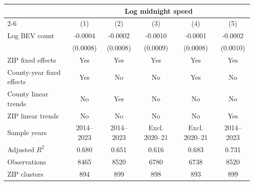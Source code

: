 {
\def\sym#1{\ifmmode^{#1}\else\(^{#1}\)\fi}
\begin{tabular}{l*{5}{c}}
\hline\hline
                    &\multicolumn{5}{c}{Log midnight speed}                                                                       \\\cmidrule(lr){2-6}
                    &\multicolumn{1}{c}{(1)}         &\multicolumn{1}{c}{(2)}         &\multicolumn{1}{c}{(3)}         &\multicolumn{1}{c}{(4)}         &\multicolumn{1}{c}{(5)}         \\
\hline
Log BEV count       &     -0.0004         &     -0.0002         &     -0.0010         &     -0.0001         &     -0.0002         \\
                    &    (0.0008)         &    (0.0008)         &    (0.0009)         &    (0.0008)         &    (0.0010)         \\
\hline
ZIP fixed effects   &         Yes         &         Yes         &         Yes         &         Yes         &         Yes         \\
County-year fixed effects&         Yes         &          No         &          No         &         Yes         &          No         \\
County linear trends&          No         &         Yes         &          No         &          No         &          No         \\
ZIP linear trends   &          No         &          No         &          No         &          No         &         Yes         \\
Sample years        &  2014--2023         &  2014--2023         &Excl. 2020--21         &Excl. 2020--21         &  2014--2023         \\
Adjusted \(R^2\)    &       0.680         &       0.651         &       0.616         &       0.683         &       0.731         \\
Observations        &        8465         &        8520         &        6780         &        6738         &        8520         \\
ZIP clusters        &         894         &         899         &         898         &         893         &         899         \\
\hline\hline
\end{tabular}
}
